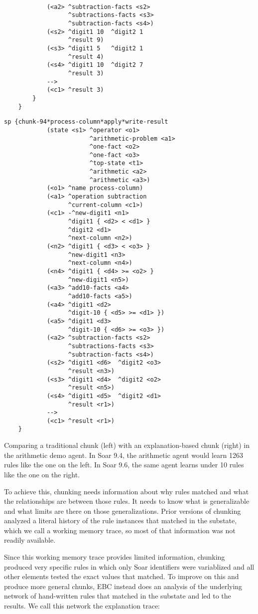 \begin{table}
\begin{multicols}{2}
\begin{Verbatim}[fontsize=\tiny]
		    
		    (<a2> ^subtraction-facts <s2>
		          ^subtractions-facts <s3>
		          ^subtraction-facts <s4>)
		    (<s2> ^digit1 10  ^digit2 1
		          ^result 9)
		    (<s3> ^digit1 5   ^digit2 1
		          ^result 4)
		    (<s4> ^digit1 10  ^digit2 7
		          ^result 3)
		    -->
		    (<c1> ^result 3)
		}
	}
	\end{Verbatim}
	\columnbreak
	\begin{Verbatim}[fontsize=\tiny]
		sp {chunk-94*process-column*apply*write-result
		    (state <s1> ^operator <o1>
		                ^arithmetic-problem <a1>
		                ^one-fact <o2>
		                ^one-fact <o3>
		                ^top-state <t1>
		                ^arithmetic <a2>
		                ^arithmetic <a3>)
		    (<o1> ^name process-column)
		    (<a1> ^operation subtraction
		          ^current-column <c1>)
		    (<c1> -^new-digit1 <n1>
		          ^digit1 { <d2> < <d1> }
		          ^digit2 <d1>
		          ^next-column <n2>)
		    (<n2> ^digit1 { <d3> < <o3> }
		          ^new-digit1 <n3>
		          ^next-column <n4>)
		    (<n4> ^digit1 { <d4> >= <o2> }
		          ^new-digit1 <n5>)
		    (<a3> ^add10-facts <a4>
			      ^add10-facts <a5>)
		    (<a4> ^digit1 <d2>
		          ^digit-10 { <d5> >= <d1> })
		    (<a5> ^digit1 <d3>
		          ^digit-10 { <d6> >= <o3> })
		    (<a2> ^subtraction-facts <s2>
		          ^subtractions-facts <s3>
		          ^subtraction-facts <s4>)
		    (<s2> ^digit1 <d6>  ^digit2 <o3>
		          ^result <n3>)
		    (<s3> ^digit1 <d4>  ^digit2 <o2>
		          ^result <n5>)
		    (<s4> ^digit1 <d5>  ^digit2 <d1>
		          ^result <r1>)
		    -->
		    (<c1> ^result <r1>)
	}
	\end{Verbatim}
\end{multicols}
	\caption{Comparing a traditional chunk (left) with an explanation-based chunk (right) in the arithmetic demo agent.  In Soar 9.4, the arithmetic agent would learn 1263 rules like the one on the left.  In Soar 9.6, the same agent learns under 10 rules like the one on the right.}
\end{table}
To achieve this, chunking needs information about why rules matched and what the relationships are between those rules.  It needs to know what is generalizable and what limits are there on those generalizations. Prior versions of chunking analyzed a literal history of the rule instances that matched in the substate, which we call a working memory trace, so most of that information was not readily available.

Since this working memory trace provides limited information, chunking produced very specific rules in which only Soar identifiers were variablized and all other elements tested the exact values that matched.  To improve on this and produce more general chunks, EBC instead does an analysis of the underlying network of hand-written rules that matched in the substate and led to the results.  We call this network the explanation trace:

